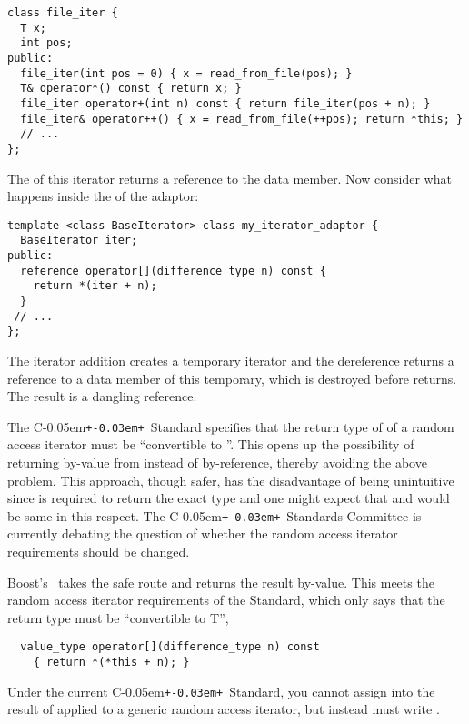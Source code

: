 \documentclass{netobjectdays}
\newcommand{\Cpp}{C\kern-0.05em\texttt{+\kern-0.03em+}}
\newcommand{\iteratoradaptor}{\code{iterator\_\-adaptor}}
\begin{document}
{\footnotesize
\begin{verbatim}
class file_iter {
  T x;
  int pos;
public:
  file_iter(int pos = 0) { x = read_from_file(pos); }
  T& operator*() const { return x; }
  file_iter operator+(int n) const { return file_iter(pos + n); }
  file_iter& operator++() { x = read_from_file(++pos); return *this; }
  // ...
};
\end{verbatim}
}

\noindent The  of this iterator returns a reference to
the data member. Now consider what happens inside the
 of the adaptor:

{\footnotesize
\begin{verbatim}
template <class BaseIterator> class my_iterator_adaptor {
  BaseIterator iter;
public:
  reference operator[](difference_type n) const {
    return *(iter + n);
  }
 // ...
};
\end{verbatim}
}

\noindent The iterator addition creates a temporary iterator and the
dereference returns a reference to a data member of this temporary,
which is destroyed before  returns. The result is a
dangling reference.

The \Cpp\ Standard specifies that the return type of 
of a random access iterator must be ``convertible to ''.  This
opens up the possibility of returning by-value from 
instead of by-reference, thereby avoiding the above problem.  This
approach, though safer, has the disadvantage of being unintuitive
since  is required to return the exact type 
and one might expect that  and  would
be same in this respect.  The \Cpp\ Standards Committee is currently
debating the question of whether the random access iterator
requirements should be changed.

Boost's \iteratoradaptor\ takes the safe route and returns the result
by-value. This meets the random access iterator requirements of the
Standard, which only says that the return type must be ``convertible
to T'',

{\footnotesize
\begin{verbatim}
  value_type operator[](difference_type n) const
    { return *(*this + n); }
\end{verbatim}
}

Under the current \Cpp\ Standard, you cannot assign into the result of
 applied to a generic random access iterator,
but instead must write .
\end{document}
